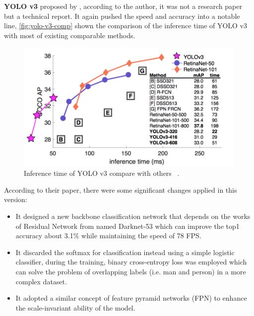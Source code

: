 \textbf{YOLO v3} proposed by \cite{yolov3-paper-2018}, according to the author,
it was not a research paper but a
technical report. It again pushed the speed and accuracy into a notable line,
\autoref{fig:yolo-v3-comp} shown
the comparison of the inference time of YOLO v3 with most of existing
comparable methods.

\begin{figure}
    \begin{center}
        \includegraphics[scale=0.7]{figures/yolov3_comp.png}
    \end{center}
    \caption{Inference time of YOLO v3 compare with others
    ~\protect\cite{focal-loss-for-dense-od}.}
    \label{fig:yolo-v3-comp}
\end{figure}

According to their paper, there were some significant changes applied in this
version:

\begin{itemize}
    \item It designed a new backbone classification network that depends on the
    works of Residual Network from \cite{resnet-paper1-2015}
    \cite{resnet-paper2-2016} named Darknet-53 which can improve the top1
    accuracy about 3.1\% while maintaining the speed of 78 FPS.

    \item It discarded the softmax for classification instead using a simple
    logistic classifier, during the training, binary cross-entropy loss was
    employed which can solve the problem of overlapping labels (i.e. man and
    person) in a more complex dataset.

    \item It adopted a similar concept of feature pyramid networks (FPN) to
    enhance the scale-invariant ability of the model.
\end{itemize}

